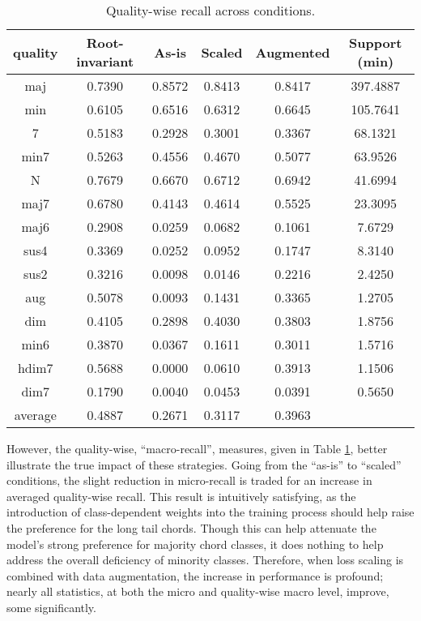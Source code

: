 \begin{table}[t]
\begin{center}
\scriptsize
\caption{Quality-wise recall across conditions.}
\label{tab:test_qualitywise}
\begin{tabular}{c|c|ccc|c}

 quality   &  Root-invariant &  As-is & Scaled & Augmented & Support (min) \\
\hline
 maj       &  0.7390 &  0.8572 &  0.8413 &  0.8417 &  397.4887 \\
 min       &  0.6105 &  0.6516 &  0.6312 &  0.6645 &  105.7641 \\
 7         &  0.5183 &  0.2928 &  0.3001 &  0.3367 &   68.1321 \\
 min7      &  0.5263 &  0.4556 &  0.4670 &  0.5077 &   63.9526 \\
 N         &  0.7679 &  0.6670 &  0.6712 &  0.6942 &   41.6994 \\
 maj7      &  0.6780 &  0.4143 &  0.4614 &  0.5525 &   23.3095 \\
 \hline
 maj6      &  0.2908 &  0.0259 &  0.0682 &  0.1061 &    7.6729 \\
 sus4      &  0.3369 &  0.0252 &  0.0952 &  0.1747 &    8.3140 \\
 sus2      &  0.3216 &  0.0098 &  0.0146 &  0.2216 &    2.4250 \\
 aug       &  0.5078 &  0.0093 &  0.1431 &  0.3365 &    1.2705 \\
 dim       &  0.4105 &  0.2898 &  0.4030 &  0.3803 &    1.8756 \\
 min6      &  0.3870 &  0.0367 &  0.1611 &  0.3011 &    1.5716 \\
 hdim7     &  0.5688 &  0.0000 &  0.0610 &  0.3913 &    1.1506 \\
 dim7      &  0.1790 &  0.0040 &  0.0453 &  0.0391 &    0.5650 \\
 \hline
 average   &  0.4887 &  0.2671 &  0.3117 &  0.3963 &  \\
\hline
\end{tabular}
\end{center}
\end{table}

However, the quality-wise, ``macro-recall'', measures, given in Table \ref{tab:test_qualitywise}, better illustrate the true impact of these strategies.
Going from the ``as-is'' to ``scaled'' conditions, the slight reduction in micro-recall is traded for an increase in averaged quality-wise recall.
This result is intuitively satisfying, as the introduction of class-dependent weights into the training process should help raise the preference for the long tail chords.
Though this can help attenuate the model's strong preference for majority chord classes, it does nothing to help address the overall deficiency of minority classes.
Therefore, when loss scaling is combined with data augmentation, the increase in performance is profound; nearly all statistics, at both the micro and quality-wise macro level, improve, some significantly.

